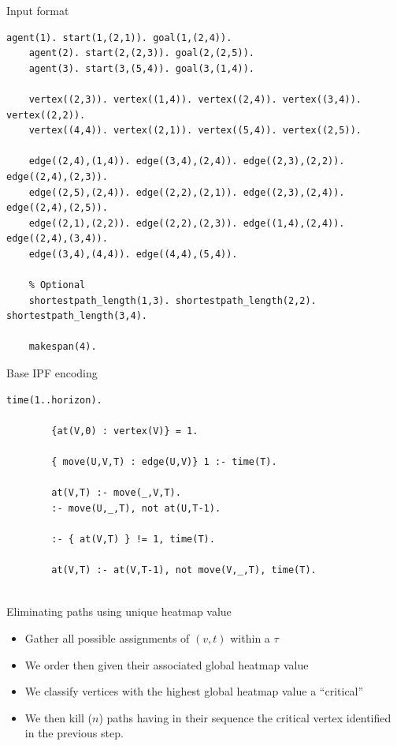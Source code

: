 \begin{frame}[fragile]{Input format}

    \begin{lstlisting}[style=mystyle]
    agent(1). start(1,(2,1)). goal(1,(2,4)). 
    agent(2). start(2,(2,3)). goal(2,(2,5)).
    agent(3). start(3,(5,4)). goal(3,(1,4)).
    
    vertex((2,3)). vertex((1,4)). vertex((2,4)). vertex((3,4)). vertex((2,2)).
    vertex((4,4)). vertex((2,1)). vertex((5,4)). vertex((2,5)). 
    
    edge((2,4),(1,4)). edge((3,4),(2,4)). edge((2,3),(2,2)). edge((2,4),(2,3)).
    edge((2,5),(2,4)). edge((2,2),(2,1)). edge((2,3),(2,4)). edge((2,4),(2,5)).
    edge((2,1),(2,2)). edge((2,2),(2,3)). edge((1,4),(2,4)). edge((2,4),(3,4)).
    edge((3,4),(4,4)). edge((4,4),(5,4)).
    
    % Optional 
    shortestpath_length(1,3). shortestpath_length(2,2). shortestpath_length(3,4).
    
    makespan(4).
    \end{lstlisting}

\end{frame}


\begin{frame}[fragile]{Base IPF encoding}
    \begin{lstlisting}[style=mystyle, caption={IPF computation}]
        time(1..horizon).

        {at(V,0) : vertex(V)} = 1.
    
        { move(U,V,T) : edge(U,V)} 1 :- time(T).
    
        at(V,T) :- move(_,V,T).
        :- move(U,_,T), not at(U,T-1).
    
        :- { at(V,T) } != 1, time(T).
    
        at(V,T) :- at(V,T-1), not move(V,_,T), time(T).
    
    \end{lstlisting}
\end{frame}



\begin{frame}{Eliminating paths using unique heatmap value}
    \begin{itemize}
        \item Gather all possible assignments of \((v, t)\) within a \(\tau\)
        \item We order then given their associated global heatmap value
        \item We classify vertices with the highest global heatmap value a ``critical''
        \item We then kill (\(n\)) paths having in their sequence the critical vertex identified in the previous step. 
    \end{itemize}
\end{frame}

